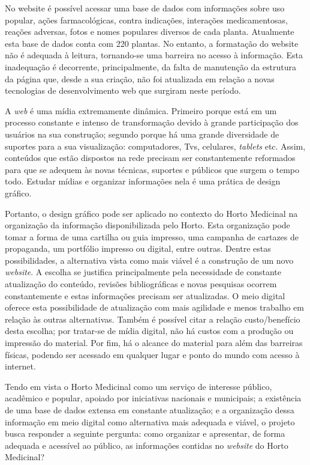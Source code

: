 No website é possível acessar uma base de dados com informações sobre uso popular, ações farmacológicas, contra indicações, interações medicamentosas, reações adversas, fotos e nomes populares diversos de cada planta. Atualmente esta base de dados conta com 220 plantas. No entanto, a formatação do website não é adequada à leitura, tornando-se uma barreira no acesso à informação. Esta inadequação é decorrente, principalmente, da falta de manutenção da estrutura da página que, desde a sua criação, não foi atualizada em relação a novas tecnologias de desenvolvimento web que surgiram neste período.

A \emph{web} é uma mídia extremamente dinâmica. Primeiro porque está em um processo constante e intenso de transformação devido à grande participação dos usuários na sua construção; segundo porque há uma grande diversidade de suportes para a sua visualização: computadores, Tvs, celulares, \emph{tablets} etc. Assim, conteúdos que estão dispostos na rede precisam ser constantemente reformados para que se adequem às novas técnicas, suportes e públicos que surgem o tempo todo. Estudar mídias e organizar informações nela é uma prática de design gráfico.

Portanto, o design gráfico pode ser aplicado no contexto do Horto Medicinal na organização da informação disponibilizada pelo Horto. Esta organização pode tomar a forma de uma cartilha ou guia impresso, uma campanha de cartazes de propaganda, um portfólio impresso ou digital, entre outras. Dentre estas possibilidades, a alternativa vista como mais viável é a construção de um novo \emph{website}. A escolha se justifica principalmente pela necessidade de constante atualização do conteúdo, revisões bibliográficas e novas pesquisas ocorrem constantemente e estas informações precisam ser atualizadas. O meio digital oferece esta possibilidade de atualização com mais agilidade e menos trabalho em relação às outras alternativas. Também é possível citar a relação custo/benefício desta escolha; por tratar-se de mídia digital, não há custos com a produção ou impressão do material. Por fim, há o alcance do material para além das barreiras físicas, podendo ser acessado em qualquer lugar e ponto do mundo com acesso à internet.

Tendo em vista o Horto Medicinal como um serviço de interesse público, acadêmico e popular, apoiado por iniciativas nacionais e municipais; a existência de uma base de dados extensa em constante atualização; e a organização dessa informação em meio digital como alternativa mais adequada e viável, o projeto busca responder a seguinte pergunta: como organizar e apresentar, de forma adequada e acessível ao público, as informações contidas no \emph{website} do Horto Medicinal?

